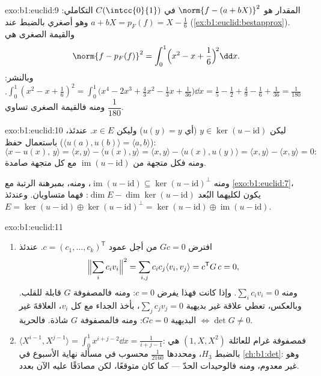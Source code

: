 \begin{solution}{exo:b1:euclid:9}
المقدار هو $\norm{f - (a + bX)}^2$ في $C(\intcc{0}{1})$  التكاملي: وهو أصغري بالضبط عند  $a + bX = p_F(f) = X - \frac16$
(\cref{ex:b1:euclid:bestapprox}). والقيمة الصغرى هي
\[
\norm{f - p_F(f)}^2 = \int_0^1 \Bigl(x^2 - x + \frac16\Bigr)^{\!2}
\dd x .
\]
وبالنشر: $\int_0^1 (x^2 - x + \frac16)^2 = \int_0^1 \bigl(x^4 - 2x^3
+ \frac{4}{3}x^2 - \frac13 x + \frac{1}{36}\bigr)\dd x = \frac15 -
\frac12 + \frac49 - \frac16 + \frac{1}{36} = \frac{1}{180}$.
ومنه فالقيمة الصغرى تساوي $\dfrac{1}{180}$.
\end{solution}

\begin{solution}{exo:b1:euclid:10}
ليكن $y \in \ker(u - \mathrm{id})$ (أي $u(y) = y$) وليكن $x \in E$.
عندئذ، باستعمال حفظ  ($\langle u(a),
u(b)\rangle = \langle a, b\rangle$):
\[
\langle x - u(x),\, y\rangle
= \langle x, y\rangle - \langle u(x), y\rangle
= \langle x, y\rangle - \langle u(x), u(y)\rangle
= \langle x, y\rangle - \langle x, y\rangle = 0 :
\]
ومنه فكل متجهة من $\operatorname{im}(u - \mathrm{id})$ 
مع كل متجهة صامدة.

ومنه $\operatorname{im}(u - \mathrm{id}) \subseteq \ker(u -
\mathrm{id})^{\perp}$، ومنه، بمبرهنة الرتبة مع
\cref{exo:b1:euclid:7}، يكون لكليهما البُعد $\dim E - \dim\ker(u -
\mathrm{id})$: فهما متساويان. وعندئذ $E = \ker(u - \mathrm{id})
\oplus \ker(u - \mathrm{id})^\perp = \ker(u - \mathrm{id}) \oplus
\operatorname{im}(u - \mathrm{id})$.
\end{solution}

\begin{solution}{exo:b1:euclid:11}
\begin{enumerate}
  \item افترض $Gc = 0$ من أجل عمود $c = (c_1, \dots,
        c_k)^{\mathsf T}$. عندئذ
        \[
        \Bigl\lVert\sum_i c_i v_i\Bigr\rVert^2
        = \sum_{i,j} c_i c_j \langle v_i, v_j\rangle
        = c^{\mathsf T} G\, c = 0,
        \]
        ومنه $\sum_i c_i v_i = 0$. وإذا كانت  فهذا
        يفرض $c = 0$: ومنه فالمصفوفة $G$ قابلة للقلب. وبالعكس، تعطي
        علاقة غير بديهية $\sum_j c_j v_j = 0$، بأخذ
        الجداء مع كل $v_i$، العلاقةَ غير البديهية
        $Gc = 0$: ومنه فالمصفوفة $G$ شاذة. فالحرية $\iff \det G \neq 0$.
  \item $\langle X^{i-1}, X^{j-1}\rangle = \int_0^1 x^{i+j-2}\dd
        x = \frac{1}{i+j-1}$: فمصفوفة غرام للعائلة $(1, X, X^2)$
        هي بالضبط  $H_3$، ومحددها
        $\frac1{2160}$ محسوب في مسألة نهاية الأسبوع في
        \cref{ch:b1:det}: وهو غير معدوم، ومنه فالوحيدات الحدّ  ---
        كما كان متوقعًا، لكن مصادَقًا عليه الآن بعدد.
\end{enumerate}
\end{solution}

